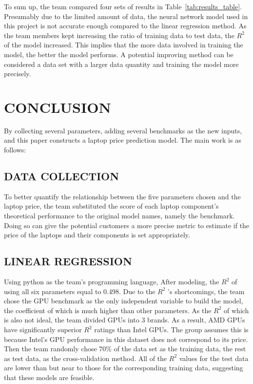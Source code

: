 \documentclass{scrartcl}
\begin{document}
\noindent To sum up, the team compared four sets of results in Table~\ref{tab:results_table}. Presumably due to the limited amount of data, the neural network model used in this project is not accurate enough compared to the linear regression method. As the team members kept increasing the ratio of training data to test data, the $R^2$ of the model increased. This implies that the more data involved in training the model, the better the model performs. A potential improving method can be considered a data set with a larger data quantity and training the model more precisely.\\




\section{CONCLUSION}




By collecting several parameters, adding several benchmarks as the new inputs, and this paper constructs a laptop price prediction model. The main work is as follows:\\

\subsection{DATA COLLECTION}
To better quantify the relationship between the five parameters chosen and the laptop price, the team substituted the score of each laptop component’s theoretical performance to the original model names, namely the benchmark. Doing so can give the potential customers a more precise metric to estimate if the price of the laptops and their components is set appropriately.\\
\subsection{LINEAR REGRESSION}
Using python as the team's programming language, After modeling, the $R^2$ of using all six parameters equal to 0.498. Due to the $R^2$ 's shortcomings, the team chose the GPU benchmark as the only independent variable to build the model, the coefficient of which is much higher than other parameters. As the $R^2$ of which is also not ideal, the team divided GPUs into 3 brands. As a result, AMD GPUs have significantly superior $R^2$ ratings than Intel GPUs. The group assumes this is because Intel's GPU performance in this dataset does not correspond to its price. Then the team randomly chose 70\% of the data set as the training data, the rest as test data, as the cross-validation method. All of the $R^2$ values for the test data are lower than but near to those for the corresponding training data, suggesting that these models are feasible.\\
\end{document}

